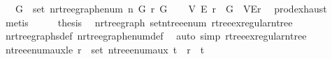 \begin{isabellebody}
\ \ \ {\isachardoublequoteopen}{\isasymexists}G{\isacharprime}{\kern0pt}\ {\isasymin}\ set\ {\isacharparenleft}{\kern0pt}n{\isacharunderscore}{\kern0pt}rtree{\isacharunderscore}{\kern0pt}graph{\isacharunderscore}{\kern0pt}enum\ n{\isacharparenright}{\kern0pt}{\isachardot}{\kern0pt}\ G{\isacharprime}{\kern0pt}\ {\isasymsimeq}\isactrlsub r\ G{\isachardoublequoteclose}\isanewline
%
\isadelimproof
%
\endisadelimproof
%
\isatagproof
{}\isamarkupfalse%
{\isacharminus}{\kern0pt}\isanewline
\ \ \isamarkupfalse%
\ V\ E\ r\ \ {\isachardoublequoteopen}G\ {\isacharequal}{\kern0pt}\ {\isacharparenleft}{\kern0pt}V{\isacharcomma}{\kern0pt}E{\isacharcomma}{\kern0pt}r{\isacharparenright}{\kern0pt}{\isachardoublequoteclose}\ \isamarkupfalse%
\ prod{\isachardot}{\kern0pt}exhaust\ \isamarkupfalse%
\ metis\isanewline
\ \ \isamarkupfalse%
\ \isamarkupfalse%
\ {\isacharquery}{\kern0pt}thesis\ \isamarkupfalse%
\ n{\isacharunderscore}{\kern0pt}rtree{\isacharunderscore}{\kern0pt}graph\ set{\isacharunderscore}{\kern0pt}n{\isacharunderscore}{\kern0pt}tree{\isacharunderscore}{\kern0pt}enum\ rtree{\isachardot}{\kern0pt}ex{\isacharunderscore}{\kern0pt}regular{\isacharunderscore}{\kern0pt}n{\isacharunderscore}{\kern0pt}tree\isanewline
\ \ \ \ \isamarkupfalse%
\ n{\isacharunderscore}{\kern0pt}rtree{\isacharunderscore}{\kern0pt}graphs{\isacharunderscore}{\kern0pt}def\ n{\isacharunderscore}{\kern0pt}rtree{\isacharunderscore}{\kern0pt}graph{\isacharunderscore}{\kern0pt}enum{\isacharunderscore}{\kern0pt}def\ \isamarkupfalse%
\ {\isacharparenleft}{\kern0pt}auto\ simp{\isacharcolon}{\kern0pt}\ rtree{\isachardot}{\kern0pt}ex{\isacharunderscore}{\kern0pt}regular{\isacharunderscore}{\kern0pt}n{\isacharunderscore}{\kern0pt}tree{\isacharparenright}{\kern0pt}\isanewline
{}\isamarkupfalse%
%
\endisatagproof
{\isafoldproof}%
%
\isadelimproof
%
\endisadelimproof
%
\isadelimdocument
%
\endisadelimdocument
%
\isatagdocument
%
\isamarkuptrue%
%
\endisatagdocument
{\isafolddocument}%
%
\isadelimdocument
%
\endisadelimdocument
{}\isamarkupfalse%
\ n{\isacharunderscore}{\kern0pt}tree{\isacharunderscore}{\kern0pt}enum{\isacharunderscore}{\kern0pt}aux{\isacharunderscore}{\kern0pt}le{\isacharcolon}{\kern0pt}\ {\isachardoublequoteopen}r\ {\isasymin}\ set\ {\isacharparenleft}{\kern0pt}n{\isacharunderscore}{\kern0pt}tree{\isacharunderscore}{\kern0pt}enum{\isacharunderscore}{\kern0pt}aux\ t{\isacharparenright}{\kern0pt}\ {\isasymLongrightarrow}\ r\ {\isasymle}\ t{\isachardoublequoteclose}\isanewline

\end{isabellebody}
